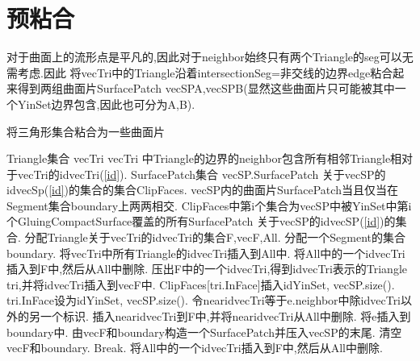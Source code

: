 \documentclass[a4paper]{book}
\renewcommand{\algorithmicrequire}{\textbf{输入:}}
\renewcommand{\algorithmicensure}{\textbf{输出:}}
\renewcommand{\algorithmicrequire}{\textbf{Input : }}
\renewcommand{\algorithmicrequire}{\textbf{Precondition : }}
\renewcommand{\algorithmicensure}{\textbf{Output : }}
\renewcommand{\algorithmicensure}{\textbf{Postcondition : }}
\numberwithin{equation}{chapter}
\theoremstyle{definition}
\begin{document}
\section{预粘合}
对于曲面上的流形点是平凡的,因此对于neighbor始终只有两个Triangle的seg可以无需考虑.因此
将vecTri中的Triangle沿着intersectionSeg=非交线的边界edge粘合起来得到两组曲面片SurfacePatch 
vecSPA,vecSPB(显然这些曲面片只可能被其中一个YinSet边界包含,因此也可分为A,B).


\begin{algorithm}\label{PrePast}
	\caption{将三角形集合粘合为一些曲面片}
	\begin{algorithmic}[1]
		\renewcommand{\algorithmicrequire}{\textbf{Input : }}
		\Require Triangle集合 vecTri
		\renewcommand{\algorithmicrequire}{\textbf{Precondition : }}
		\Require vecTri 中Triangle的边界的neighbor包含所有相邻Triangle相对于vecTri的idvecTri(\ref{id}).
		\renewcommand{\algorithmicensure}{\textbf{Output : }}
        \Ensure SurfacePatch集合 vecSP.SurfacePatch 关于vecSP的idvecSp(\ref{id})的集合的集合ClipFaces.
		\renewcommand{\algorithmicensure}{\textbf{Postcondition : }}
		\Ensure vecSP内的曲面片SurfacePatch当且仅当在Segment集合boundary上两两相交.
        ClipFaces中第i个集合为vecSP中被YinSet中第i个GluingCompactSurface覆盖的所有SurfacePatch
        关于vecSP的idvecSP(\ref{id})的集合.
        \State 分配Triangle关于vecTri的idvecTri的集合F,vecF,All.
        \State 分配一个Segment的集合boundary.
        \State 将vecTri中所有Triangle的idvecTri插入到All中.
        \State 将All中的一个idvecTri插入到F中,然后从All中删除.
        \State 压出F中的一个idvecTri,得到idvecTri表示的Triangle tri,并将idvecTri插入到vecF中.
        \State ClipFaces[tri.InFace]插入{idYinSet, vecSP.size()}.
        \State tri.InFace设为{idYinSet, vecSP.size()}.
        \State 令nearidvecTri等于e.neighbor中除idvecTri以外的另一个标识.
        \State 插入nearidvecTri到F中,并将nearidvecTri从All中删除.
        \EndIf
        \Else
        \State 将e插入到boundary中.
        \EndIf
        \State 由vecF和boundary构造一个SurfacePatch并压入vecSP的末尾.
        \State 清空vecF和boundary.
        \State Break.
        \EndIf
        \State 将All中的一个idvecTri插入到F中,然后从All中删除.
        \EndIf
        \EndFor
        \EndWhile
        \EndFunction
	\end{algorithmic}
\end{algorithm}
\end{document}
